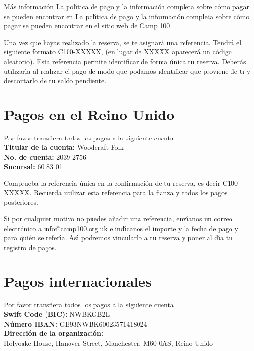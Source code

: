 \documentclass[a4paper, 11pt]{report}
\begin{document}
\begin{callout-orange}{M\'as informaci\'on}
    La pol\'{\i}tica de pago y la informaci\'on completa sobre c\'omo pagar se pueden encontrar en \href{https://camp100.org.uk}{La pol\'{\i}tica de pago y la informaci\'on completa sobre c\'omo pagar se pueden encontrar en el sitio web de Camp 100}
\end{callout-orange}

Una vez que hayas realizado la reserva, se te asignar\'a una referencia. Tendr\'a el siguiente formato C100-XXXXX, (en lugar de XXXXX aparecer\'a un c\'odigo aleatorio).
Esta referencia permite identificar de forma \'unica tu reserva. Deber\'as utilizarla al realizar el pago de modo que podamos identificar que proviene de ti y descontarlo de tu saldo pendiente.


\section{Pagos en el Reino Unido}

Por favor transfiera todos los pagos a la siguiente cuenta\\
\textbf{Titular de la cuenta:} Woodcraft Folk\\
\textbf{No. de cuenta:} 2039 2756\\
\textbf{Sucursal:} 60 83 01

Comprueba la referencia \'unica en la confirmaci\'on de tu reserva, es decir C100-XXXXX. Recuerda utilizar esta referencia para la fianza y todos los pagos posteriores. 

Si por cualquier motivo no puedes a\~nadir una referencia, env\'{\i}anos un correo electr\'onico a info@camp100.org.uk e ind\'{\i}canos el importe y la fecha de pago y para qui\'en se refer\'{\i}a. As\'{\i} podremos vincularlo a tu reserva y poner al d\'{\i}a tu registro de pagos.


\section{Pagos internacionales}

Por favor transfiera todos los pagos a la siguiente cuenta\\
\textbf{Swift Code (BIC):} NWBKGB2L\\
\textbf{N\'umero IBAN:} GB93NWBK60023571418024\\
\textbf{Direcci\'on de la organizaci\'on:} \\
Holyoake House, Hanover Street, Manchester, M60 0AS, Reino Unido
\end{document}
